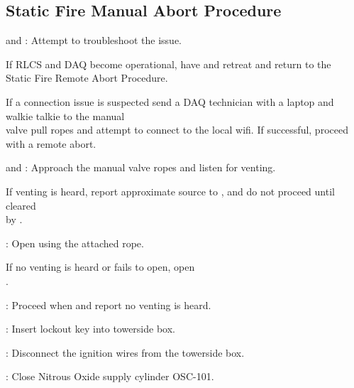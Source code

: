 \subsection{Static Fire Manual Abort Procedure}
\begin{checklist}
     \item \rlcs{} and \daq{}: Attempt to troubleshoot the issue. 
      \begin{checklist}[label=$\bullet$]
            \item If RLCS and DAQ become operational, have \primary{} and \secondary{} retreat and return to the \\ \phantom{} \hspace{7ex} Static Fire Remote Abort Procedure. 
            \item If a connection issue is suspected send a DAQ technician with a laptop and walkie talkie to the manual \\ \phantom{} \hspace{7ex} valve pull ropes and attempt to connect to the local wifi. If successful, proceed with a remote abort. 
    \end{checklist}
    \item \primary{} and \secondary{}: Approach the manual valve ropes and listen for venting. 
    \begin{checklist}[label=$\bullet$]
            \item If venting is heard, report approximate source to \ops{}, and do not proceed until cleared \\ \phantom{} \hspace{7ex} by \ops{}.
    \end{checklist}
    \item \primary{}: Open \moxdrain{} using the attached rope. 
    \begin{checklist}[label=$\bullet$]
            \item If no venting is heard or \moxdrain{} fails to open, open \\ \phantom{} \hspace{7ex} \ohshit{}. 
    \end{checklist}
    \item \ops{}: Proceed when \primary{} and \secondary{} report no venting is heard.
    \item \secondary{}: Insert lockout key into towerside box. 
    \item \secondary{}: Disconnect the ignition wires from the towerside box. 
    \item \primary{}: Close Nitrous Oxide supply cylinder OSC-101. 

\end{checklist}
